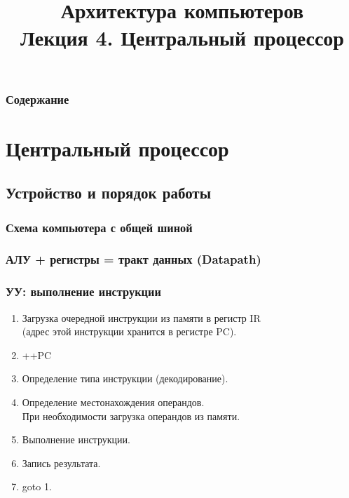 \newcommand{\h}{handout,%
}



\title[Центральный процессор]{Архитектура компьютеров\texorpdfstring{\\}{ }Лекция 4. Центральный процессор}



\begin{frame}
\titlepage
\end{frame}

\begin{frame}
\frametitle{Содержание}
\tableofcontents[hideallsubsections]
\end{frame}

\section {Центральный процессор}

\subsection{Устройство и порядок работы}

\begin{frame}
\frametitle{Схема компьютера с общей шиной}
\end{frame}

\begin{frame}
\frametitle{АЛУ + регистры = тракт данных (Datapath)}
\end{frame}

\begin{frame}
\frametitle{УУ: выполнение инструкции}
\begin{enumerate}[<+->]
    \item Загрузка очередной инструкции из памяти в регистр IR\\
    (адрес этой инструкции хранится в регистре PC).
    \item ++PC
    \item Определение типа инструкции (декодирование).
    \item Определение местонахождения операндов.\\
        При необходимости загрузка операндов из памяти.
    \item Выполнение инструкции.
    \item Запись результата.
    \item goto 1.
\end{enumerate}
\end{frame}

